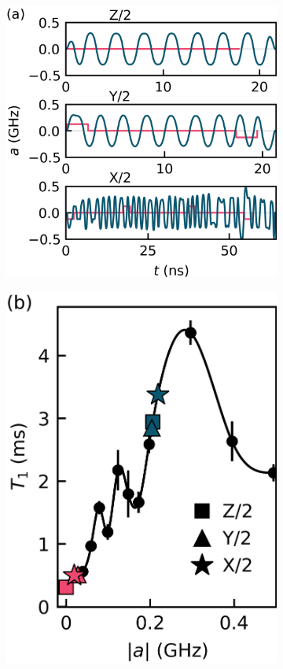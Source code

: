 \begin{figure}[ht]
  
  \begin{subfigure}{.315\textwidth}
    \includegraphics[width=\linewidth]{assets/f1a.png}
    \caption{\label{fig:longitudea}}
  \end{subfigure}\hfill
  \begin{subfigure}{.23\textwidth}
    \includegraphics[width=\linewidth]{assets/f1b.png}

\end{subfigure}
\end{figure}
